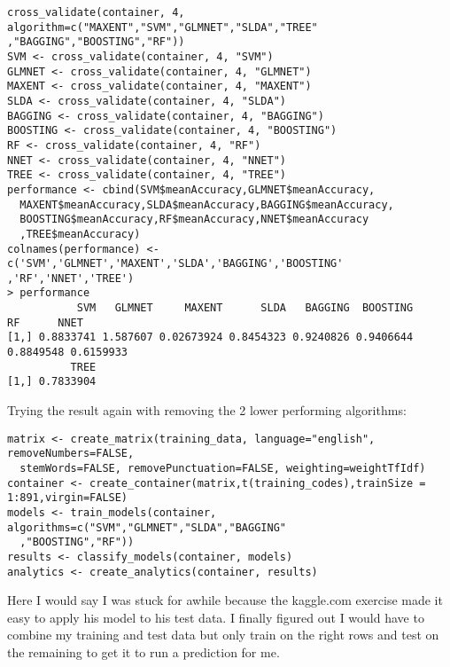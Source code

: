 \documentclass[10pt]{article}
\begin{document}
\begin{verbatim}
cross_validate(container, 4, algorithm=c("MAXENT","SVM","GLMNET","SLDA","TREE"
,"BAGGING","BOOSTING","RF"))
SVM <- cross_validate(container, 4, "SVM")
GLMNET <- cross_validate(container, 4, "GLMNET")
MAXENT <- cross_validate(container, 4, "MAXENT")
SLDA <- cross_validate(container, 4, "SLDA")
BAGGING <- cross_validate(container, 4, "BAGGING")
BOOSTING <- cross_validate(container, 4, "BOOSTING")
RF <- cross_validate(container, 4, "RF")
NNET <- cross_validate(container, 4, "NNET")
TREE <- cross_validate(container, 4, "TREE")
performance <- cbind(SVM$meanAccuracy,GLMNET$meanAccuracy,
  MAXENT$meanAccuracy,SLDA$meanAccuracy,BAGGING$meanAccuracy,
  BOOSTING$meanAccuracy,RF$meanAccuracy,NNET$meanAccuracy
  ,TREE$meanAccuracy)
colnames(performance) <- c('SVM','GLMNET','MAXENT','SLDA','BAGGING','BOOSTING'
,'RF','NNET','TREE')
> performance
           SVM   GLMNET     MAXENT      SLDA   BAGGING  BOOSTING        RF      NNET
[1,] 0.8833741 1.587607 0.02673924 0.8454323 0.9240826 0.9406644 0.8849548 0.6159933
          TREE
[1,] 0.7833904
\end{verbatim}
Trying the result again with removing the 2 lower performing algorithms:
\begin{verbatim}
matrix <- create_matrix(training_data, language="english", removeNumbers=FALSE, 
  stemWords=FALSE, removePunctuation=FALSE, weighting=weightTfIdf)
container <- create_container(matrix,t(training_codes),trainSize = 1:891,virgin=FALSE)
models <- train_models(container, algorithms=c("SVM","GLMNET","SLDA","BAGGING"
  ,"BOOSTING","RF"))
results <- classify_models(container, models)
analytics <- create_analytics(container, results)
\end{verbatim}
Here I would say I was stuck for awhile because the kaggle.com exercise made it easy to apply his model to his test data. I finally figured out I would have to combine my training and test data but only train on the right rows and test on the remaining to get it to run a prediction for me.
\end{document}
